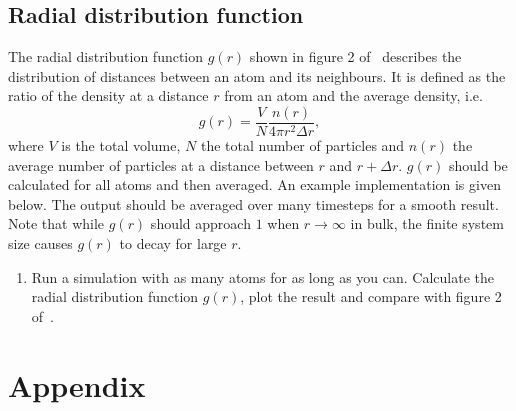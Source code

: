 \documentclass[11pt,british,a4paper]{report}
\renewcommand{\thesubsection}{\arabic{section}\alph{subsection})}
\begin{document}
\subsection{Radial distribution function}
The radial distribution function \(g(r)\) shown in figure 2 of~\cite{Rahman_1964} describes the distribution of distances between an atom and its neighbours. It is defined as the ratio of the density at a distance \(r\) from an atom and the average density, i.e.
\begin{equation}
    g(r) = \frac{V}{N} \frac{n(r)}{4\pi r^2\Delta r},\label{eq:rdf}
\end{equation}
where \(V\) is the total volume, \(N\) the total number of particles and \(n(r)\) the average number of particles at a distance between \(r\) and \(r+\Delta r\). \(g(r)\) should be calculated for all atoms and then averaged. An example implementation is given below. The output should be averaged over many timesteps for a smooth result. Note that while \(g(r)\) should approach \(1\) when \(r\to\infty\) in bulk, the finite system size causes \(g(r)\) to decay for large \(r\).
\begin{enumerate}[label=\roman*.]
    \item Run  a simulation with as many atoms for as long as you can. Calculate the radial distribution function \(g(r)\), plot the result and compare with figure 2 of~\cite{Rahman_1964}.
\end{enumerate}







\clearpage
\appendix
\section*{Appendix}
\setcounter{subsection}{0}
\renewcommand{\thesubsection}{\Alph{subsection}}

\end{document}
